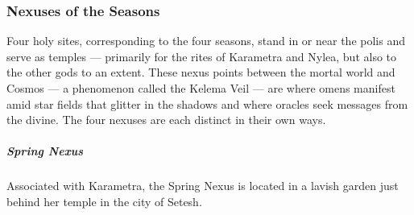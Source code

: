     \thispagestyle{empty} %

    \subsubsection{Nexuses of the Seasons}
        Four holy sites, corresponding to the four seasons, stand in or near the polis and serve as temples --- primarily for the rites of Karametra and Nylea, but also to the other gods to an extent.
        These nexus points between the mortal world and Cosmos --- a phenomenon called the Kelema Veil --- are where omens manifest amid star fields that glitter in the shadows and where oracles seek messages from the divine. The four nexuses are each distinct in their own ways.

        \subparagraph{Spring Nexus} Associated with Karametra, the Spring Nexus is located in a lavish garden just behind her temple in the city of Setesh.

